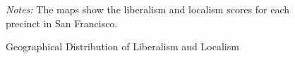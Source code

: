 \documentclass[article,11pt]{memoir}
\begin{document}
\begin{figure}\centering
  \caption{Geographical Distribution of Liberalism and Localism}
  \label{fig:g_pc_map}
  \begin{measuredfigure}
  \end{measuredfigure}
  \begin{tablenotes}[flushleft]
    \item \hspace{-.2em}\emph{Notes:} The maps show the liberalism and localism scores for each precinct in San Francisco.
  \end{tablenotes}
\end{figure}
\end{document}
